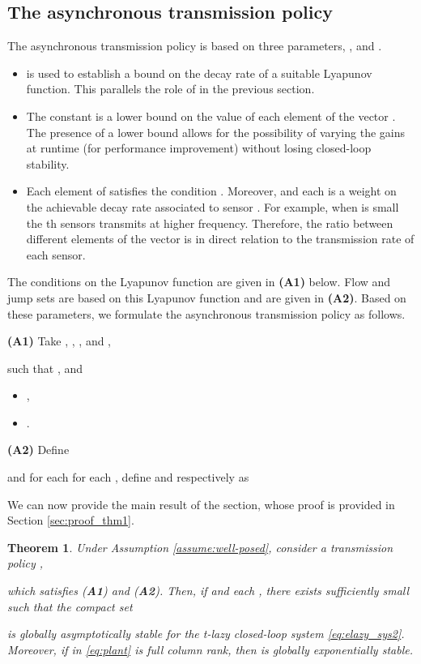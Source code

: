 \documentclass[twocolumn]{autart}
\newtheorem{theorem}{Theorem}
\begin{document}
\subsection{The asynchronous transmission policy}

The { asynchronous} transmission policy is based on three parameters,
,  and . 
{
\begin{itemize}
\item  is used to establish a bound on the decay rate of a suitable Lyapunov function.
This parallels the role of  in the previous section.
\item The constant  is a lower bound on the value of each
element of the vector . The presence of a lower bound allows for the
possibility of varying the gains  at runtime (for performance improvement) without losing closed-loop stability. 
\item Each element  of  satisfies
the condition . Moreover, 
and each  is a weight on the achievable decay rate associated to sensor .
For example,  when  is small the th sensors transmits at higher
frequency. Therefore, the ratio between different elements of the vector  is
in direct relation to the transmission rate of each sensor.
\end{itemize}
The conditions on the Lyapunov function are given in \textbf{(A1)} below. 
Flow and jump sets are based on this Lyapunov function and are given in \textbf{(A2)}.
Based on these parameters, we formulate the 
asynchronous transmission
policy as follows.
}

\noindent\textbf{(A1)} 
Take , , , and 
, 

such that ,  and 
\begin{itemize}
\item ,
\item .
\end{itemize}

\noindent\textbf{(A2)} Define 
  
and for each 
for each , define   and  
 respectively as 

We can now provide the main result of the section, 
whose proof is provided in Section \ref{sec:proof_thm1}. 
\begin{theorem} 
\label{thm:GAS_asynchronous}
Under Assumption \ref{assume:well-posed}, consider a transmission policy 
,

which satisfies (\textbf{A1}) and (\textbf{A2}). 
Then, if  and each 
, there exists  sufficiently small
such that the compact set

is globally asymptotically stable for the 
t-lazy closed-loop system \eqref{eq:elazy_sys2}. 
Moreover,
if  in \eqref{eq:plant} is full column rank, then 
 is globally exponentially stable.
\end{theorem}
\end{document}
